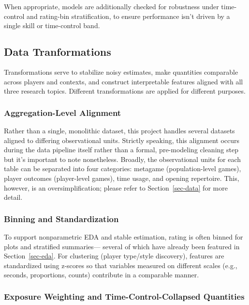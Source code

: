 \documentclass[
  12pt]{article}
\begin{document}
When appropriate, models are additionally checked for robustness under
time-control and rating-bin stratification, to ensure performance isn't
driven by a single skill or time-control band.

\subsection{Data Tranformations}\label{data-tranformations}

Transformations serve to stabilize noisy estimates, make quantities
comparable across players and contexts, and construct interpretable
features aligned with all three research topics. Different
transformations are applied for different purposes.

\subsubsection{Aggregation-Level Alignment}\label{sec-aggregation}

Rather than a single, monolithic dataset, this project handles several
datasets aligned to differing observational units. Strictly speaking,
this alignment occurs during the data pipeline itself rather than a
formal, pre-modeling cleaning step but it's important to note
nonetheless. Broadly, the observational units for each table can be
separated into four categories: metagame (population-level games),
player outcomes (player-level games), time usage, and opening
repertoire. This, however, is an oversimplification; please refer to
Section~\ref{sec-data} for more detail.

\subsubsection{Binning and
Standardization}\label{binning-and-standardization}

To support nonparametric EDA and stable estimation, rating is often
binned for plots and stratified summaries--- several of which have
already been featured in Section~\ref{sec-eda}. For clustering (player
type/style discovery), features are standardized using z-scores so that
variables measured on different scales (e.g., seconds, proportions,
counts) contribute in a comparable manner.

\subsubsection{Exposure Weighting and Time-Control-Collapsed
Quantities}\label{exposure-weighting-and-time-control-collapsed-quantities}
\end{document}
